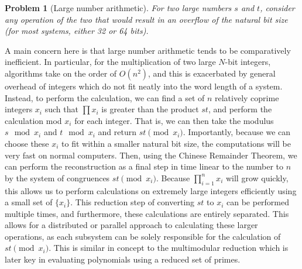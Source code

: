 \documentclass[pageno]{jpaper}
\newtheorem{problem}{Problem}[section]
\begin{document}
\begin{problem}[Large number arithmetic]
  For two large numbers $s$ and $t$, consider any operation of the two that would result in an overflow of the natural bit size (for most systems, either 32 or 64 bits).
\end{problem}
A main concern here is that large number arithmetic tends to be comparatively inefficient.
In particular, for the multiplication of two large $N$-bit integers, algorithms take on the order of $O(n^2)$, and this is exacerbated by general overhead of integers which do not fit neatly into the word length of a system.
Instead, to perform the calculation, we can find a set of $n$ relatively coprime integers $x_i$ such that $\prod x_i$ is greater than the product $st$, and perform the calculation mod $x_i$ for each integer.
That is, we can then take the modulus $s\mod x_i$ and $t\mod x_i$ and return $st\pmod x_i$.
Importantly, because we can choose these $x_i$ to fit within a smaller natural bit size, the computations will be very fast on normal computers.
Then, using the Chinese Remainder Theorem, we can perform the reconstruction as a final step in time linear to the number to $n$ by the system of congruences $st\pmod x_i$.
Because $\prod_{i=1}^n x_i$ will grow quickly, this allows us to perform calculations on extremely large integers efficiently using a small set of $\{x_i\}$.
This reduction step of converting $st$ to $x_i$ can be performed multiple times, and furthermore, these calculations are entirely separated.
This allows for a distributed or parallel approach to calculating these larger operations, as each subsystem can be solely responsible for the calculation of $st\pmod x_i$.
This is similar in concept to the multimodular reduction which is later key in evaluating polynomials using a reduced set of primes.
\end{document}
